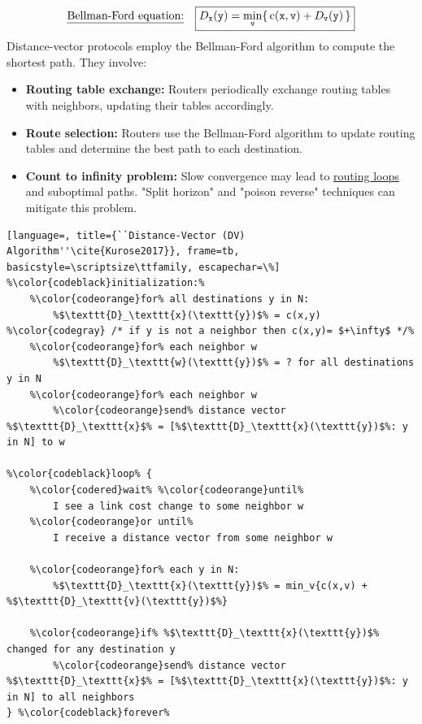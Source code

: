$$
    \text{\underline{Bellman-Ford equation:}} \quad \boxed{ D_\texttt{x}(\texttt{y}) = \min_\texttt{v}\{\, \text{c}(\texttt{x}, \texttt{v}) + D_\texttt{v}(\texttt{y})\, \} }
$$
Distance-vector protocols employ the Bellman-Ford algorithm to compute the shortest path. They involve:

\begin{itemize}
    \item \textbf{Routing table exchange:} Routers periodically exchange routing tables with neighbors, updating their tables accordingly.
    
    \item \textbf{Route selection:} Routers use the Bellman-Ford algorithm to update routing tables and determine the best path to each destination.
    
    \item \textbf{Count to infinity problem:} Slow convergence may lead to \underline{routing loops} and suboptimal paths. "Split horizon" and "poison reverse" techniques can mitigate this problem.
\end{itemize}

\begin{lstlisting}[language=, title={``Distance-Vector (DV) Algorithm''\cite{Kurose2017}}, frame=tb, basicstyle=\scriptsize\ttfamily, escapechar=\%]
%\color{codeblack}initialization:%
    %\color{codeorange}for% all destinations y in N:
        %$\texttt{D}_\texttt{x}(\texttt{y})$% = c(x,y) %\color{codegray} /* if y is not a neighbor then c(x,y)= $+\infty$ */%
    %\color{codeorange}for% each neighbor w
        %$\texttt{D}_\texttt{w}(\texttt{y})$% = ? for all destinations y in N
    %\color{codeorange}for% each neighbor w
        %\color{codeorange}send% distance vector %$\texttt{D}_\texttt{x}$% = [%$\texttt{D}_\texttt{x}(\texttt{y})$%: y in N] to w

%\color{codeblack}loop% {
    %\color{codered}wait% %\color{codeorange}until% 
        I see a link cost change to some neighbor w
    %\color{codeorange}or until% 
        I receive a distance vector from some neighbor w
    
    %\color{codeorange}for% each y in N:
        %$\texttt{D}_\texttt{x}(\texttt{y})$% = min_v{c(x,v) + %$\texttt{D}_\texttt{v}(\texttt{y})$%}
    
    %\color{codeorange}if% %$\texttt{D}_\texttt{x}(\texttt{y})$% changed for any destination y
        %\color{codeorange}send% distance vector %$\texttt{D}_\texttt{x}$% = [%$\texttt{D}_\texttt{x}(\texttt{y})$%: y in N] to all neighbors
} %\color{codeblack}forever%
\end{lstlisting}

